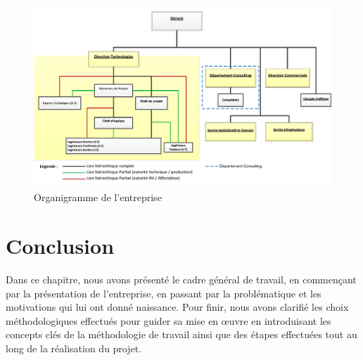 \begin{spacing}{1.5}
\begin{figure}[h]
\centering
\includegraphics[scale=0.8]{organigramme.png}
\caption{Organigramme de l'entreprise}
\label{fig:gantt}
\end{figure}


\section*{Conclusion}
Dans ce chapitre, nous avons présenté le cadre général de travail, en commençant par la présentation de l'entreprise, en passant par la problématique et les motivations qui lui ont donné naissance. Pour finir, nous avons clarifié les choix méthodologiques effectués pour guider sa mise en œuvre en introduisant les concepts clés de la méthodologie de travail ainsi que des étapes effectuées tout au long de la réalisation du projet.


\end{spacing}
